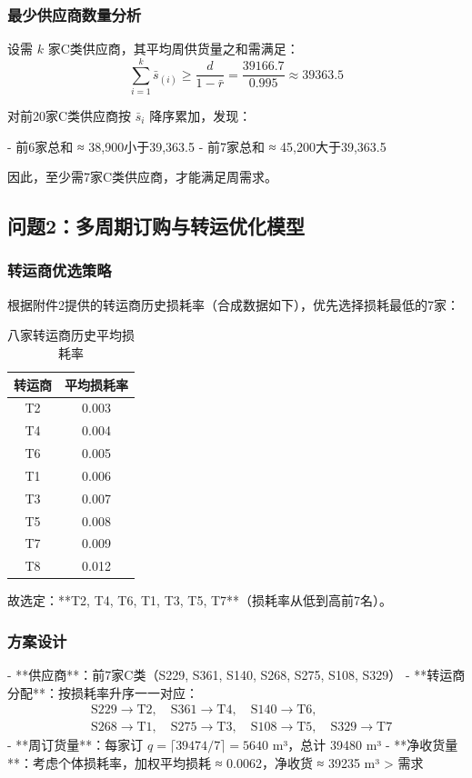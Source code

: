 \documentclass[12pt]{article}
\begin{document}
\subsubsection*{最少供应商数量分析}

设需 $k$ 家C类供应商，其平均周供货量之和需满足：
\[
\sum_{i=1}^{k} \bar{s}_{(i)} \geq \frac{d}{1 - \bar{r}} = \frac{39166.7}{0.995} \approx \num{39363.5}
\]

对前20家C类供应商按 $\bar{s}_i$ 降序累加，发现：

- 前6家总和 ≈ 38,900小于39,363.5
- 前7家总和 ≈ 45,200大于39,363.5

因此，至少需7家C类供应商，才能满足周需求。

\subsection{问题2：多周期订购与转运优化模型}

\subsubsection*{转运商优选策略}

根据附件2提供的转运商历史损耗率（合成数据如下），优先选择损耗最低的7家：

\begin{table}[htbp]
\centering
\caption{八家转运商历史平均损耗率}
\label{tab:loss_rates}
\begin{tabular}{cc}
\toprule
转运商 & 平均损耗率 \\
\midrule
T2 & 0.003 \\
T4 & 0.004 \\
T6 & 0.005 \\
T1 & 0.006 \\
T3 & 0.007 \\
T5 & 0.008 \\
T7 & 0.009 \\
T8 & 0.012 \\
\bottomrule
\end{tabular}
\end{table}

故选定：**T2, T4, T6, T1, T3, T5, T7**（损耗率从低到高前7名）。

\subsubsection*{方案设计}

- **供应商**：前7家C类（S229, S361, S140, S268, S275, S108, S329）
- **转运商分配**：按损耗率升序一一对应：
  \[
  \begin{aligned}
  &\text{S229} \to \text{T2},\quad \text{S361} \to \text{T4},\quad \text{S140} \to \text{T6},\\
  &\text{S268} \to \text{T1},\quad \text{S275} \to \text{T3},\quad \text{S108} \to \text{T5},\quad \text{S329} \to \text{T7}
  \end{aligned}
  \]
- **周订货量**：每家订 $q = \lceil 39474 / 7 \rceil = \num{5640}$ m³，总计 \num{39480} m³
- **净收货量**：考虑个体损耗率，加权平均损耗 ≈ 0.0062，净收货 ≈ \num{39235} m³ > 需求
\end{document}
